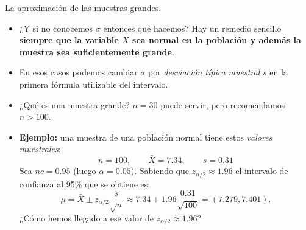\documentclass[
  9pt,
  ignorenonframetext,
]{beamer}
\begin{document}
\begin{frame}{La aproximación de las muestras grandes.}
\protect\hypertarget{la-aproximacion-de-las-muestras-grandes.}{}

\begin{itemize}
\item
  ¿Y si no conocemos \(\sigma\) entonces qué hacemos? Hay un remedio
  sencillo \textbf{siempre que la variable \(X\) sea normal en la
  población y además la muestra sea suficientemente grande}.
\item
  En esos casos podemos cambiar \(\sigma\) por \emph{desviación típica
  muestral} \(s\) en la primera fórmula utilizable del intervalo.

  \begin{center}
  \end{center}
\item
  ¿Qué es una muestra grande? \(n = 30\) puede servir, pero recomendamos
  \(n > 100\).
\item
  \textbf{Ejemplo:} una muestra de una población normal tiene estos
  \emph{valores muestrales}:
  \[n = 100,\qquad \bar X = 7.34, \qquad s = 0.31\] Sea \(nc = 0.95\)
  (luego \(\alpha = 0.05\)). Sabiendo que \(z_{\alpha/2}\approx 1.96\)
  el intervalo de confianza al 95\% que se obtiene es: \[
  \mu = \bar X \pm z_{\alpha/2}\dfrac{s}{\sqrt{n}} \approx 7.34 + 1.96 \dfrac{0.31}{\sqrt{100}} =  
  (7.279, 7.401).
  \] ¿Cómo hemos llegado a ese valor de \(z_{\alpha/2}\approx 1.96\)?
\end{itemize}

\end{frame}
\end{document}

